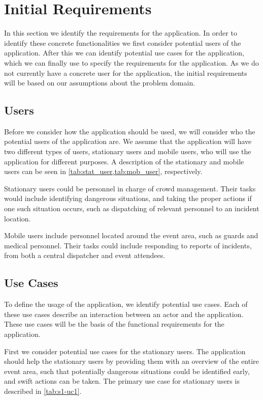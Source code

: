 \section{Initial Requirements}\label{sec:s1_requirements}
In this section we identify the requirements for the application. In order to identify these concrete functionalities we first consider potential users of the application. After this we can identify potential use cases for the application, which we can finally use to specify the requirements for the application. As we do not currently have a concrete user for the application, the initial requirements will be based on our assumptions about the problem domain. 

\subsection{Users} \label{ss:s1_users}
Before we consider how the application should be used, we will consider who the potential users of the application are. We assume that the application will have two different types of users, stationary users and mobile users, who will use the application for different purposes. A description of the stationary and mobile users can be seen in \cref{tab:stat_user,tab:mob_user}, respectively.

Stationary users could be personnel in charge of crowd management. Their tasks would include identifying dangerous situations, and taking the proper actions if one such situation occurs, such as dispatching of relevant personnel to an incident location.



Mobile users include personnel located around the event area, such as guards and medical personnel. Their tasks could include responding to reports of incidents, from both a central dispatcher and event attendees.



\subsection{Use Cases} \label{ss:s1_uc}
To define the usage of the application, we identify potential use cases. Each of these use cases describe an interaction between an actor and the application. These use cases will be the basis of the functional requirements for the application.

First we consider potential use cases for the stationary users. The application should help the stationary users by providing them with an overview of the entire event area, such that potentially dangerous situations could be identified early, and swift actions can be taken. The primary use case for stationary users is described in \cref{tab:s1-uc1}.


